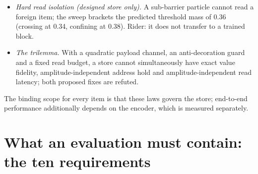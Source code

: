 \documentclass{article} %
\newcommand{\sci}[2]{\ensuremath{#1\times10^{#2}}}
\begin{document}
\begin{itemize}[leftmargin=*,itemsep=1pt]
  matches stored-activation gradients to \sci{2.1}{-6} relative in float32, with a peak activation
  memory of 6.3 KB against 6.00 MB at $T=1024$; the match is exact only at zero damping. %
\item \emph{Hard read isolation (designed store only).} A sub-barrier particle cannot read a
  foreign item; the sweep brackets the predicted threshold mass of 0.36 (crossing at 0.34,
  confining at 0.38). Rider: it does not transfer to a trained block. %
\item \emph{The trilemma.} With a quadratic payload channel, an anti-decoration guard and a fixed
  read budget, a store cannot simultaneously have exact value fidelity, amplitude-independent
  address hold and amplitude-independent read latency; both proposed fixes are refuted.
\end{itemize}
The binding scope for every item is that these laws govern the store; end-to-end performance
additionally depends on the encoder, which is measured separately. %

\section{What an evaluation must contain: the ten requirements}
\label{app:bench}
\end{document}
